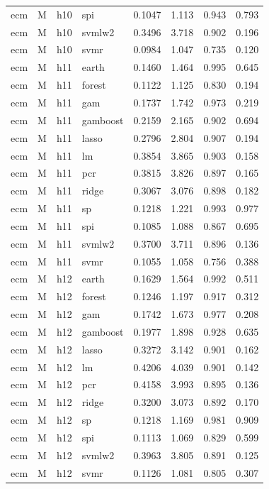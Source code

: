 \begin{ThreePartTable}
\begin{longtable}[t]{llclcccc}
ecm & M & h10 & spi & 0.1047 & 1.113 & 0.943 & 0.793\\
ecm & M & h10 & svmlw2 & 0.3496 & 3.718 & 0.902 & 0.196\\
ecm & M & h10 & svmr & 0.0984 & 1.047 & 0.735 & 0.120\\
\addlinespace
ecm & M & h11 & earth & 0.1460 & 1.464 & 0.995 & 0.645\\
ecm & M & h11 & forest & 0.1122 & 1.125 & 0.830 & 0.194\\
ecm & M & h11 & gam & 0.1737 & 1.742 & 0.973 & 0.219\\
ecm & M & h11 & gamboost & 0.2159 & 2.165 & 0.902 & 0.694\\
ecm & M & h11 & lasso & 0.2796 & 2.804 & 0.907 & 0.194\\
ecm & M & h11 & lm & 0.3854 & 3.865 & 0.903 & 0.158\\
ecm & M & h11 & pcr & 0.3815 & 3.826 & 0.897 & 0.165\\
ecm & M & h11 & ridge & 0.3067 & 3.076 & 0.898 & 0.182\\
ecm & M & h11 & sp & 0.1218 & 1.221 & 0.993 & 0.977\\
ecm & M & h11 & spi & 0.1085 & 1.088 & 0.867 & 0.695\\
ecm & M & h11 & svmlw2 & 0.3700 & 3.711 & 0.896 & 0.136\\
ecm & M & h11 & svmr & 0.1055 & 1.058 & 0.756 & 0.388\\
\addlinespace
ecm & M & h12 & earth & 0.1629 & 1.564 & 0.992 & 0.511\\
ecm & M & h12 & forest & 0.1246 & 1.197 & 0.917 & 0.312\\
ecm & M & h12 & gam & 0.1742 & 1.673 & 0.977 & 0.208\\
ecm & M & h12 & gamboost & 0.1977 & 1.898 & 0.928 & 0.635\\
ecm & M & h12 & lasso & 0.3272 & 3.142 & 0.901 & 0.162\\
ecm & M & h12 & lm & 0.4206 & 4.039 & 0.901 & 0.142\\
ecm & M & h12 & pcr & 0.4158 & 3.993 & 0.895 & 0.136\\
ecm & M & h12 & ridge & 0.3200 & 3.073 & 0.892 & 0.170\\
ecm & M & h12 & sp & 0.1218 & 1.169 & 0.981 & 0.909\\
ecm & M & h12 & spi & 0.1113 & 1.069 & 0.829 & 0.599\\
ecm & M & h12 & svmlw2 & 0.3963 & 3.805 & 0.891 & 0.125\\
ecm & M & h12 & svmr & 0.1126 & 1.081 & 0.805 & 0.307\\

\end{longtable}
\end{ThreePartTable}
